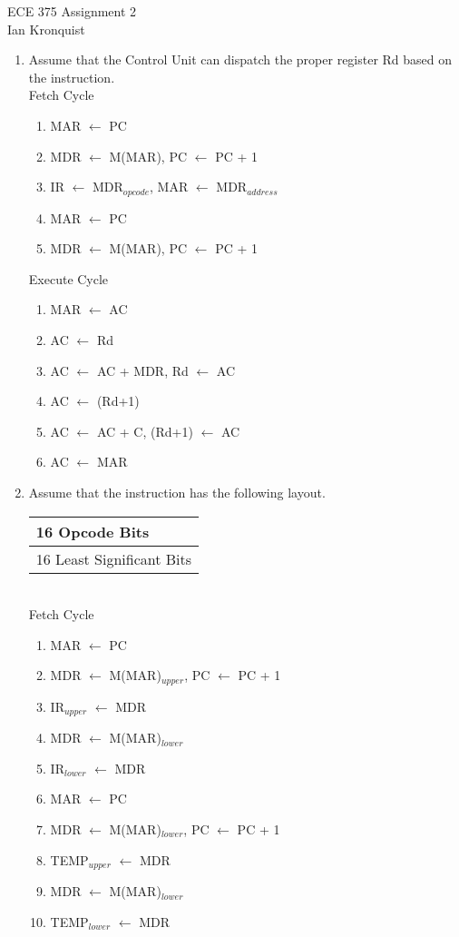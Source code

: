 \documentclass[12pt,letterpaper]{article}
\begin{document}
\begin{flushright}
{\large
ECE 375 Assignment 2\\
Ian Kronquist
}
\end{flushright}

\bigskip

\begin{enumerate}
    \item Assume that the Control Unit can dispatch the proper register Rd
    based on the instruction.\\
    Fetch Cycle
    \begin{enumerate}[i]
        \item MAR $\leftarrow$ PC
        \item MDR $\leftarrow$ M(MAR), PC $\leftarrow$ PC + 1
        \item IR $\leftarrow$ MDR$_{opcode}$, MAR $\leftarrow$ MDR$_{address}$
        \item MAR $\leftarrow$ PC
        \item MDR $\leftarrow$ M(MAR), PC $\leftarrow$ PC + 1
    \end{enumerate}

    Execute Cycle
    \begin{enumerate}[i]
        \item MAR $\leftarrow$ AC
        \item AC $\leftarrow$ Rd
        \item AC $\leftarrow$ AC + MDR, Rd $\leftarrow$ AC
        \item AC  $\leftarrow$ (Rd+1)
        \item AC $\leftarrow$ AC + C, (Rd+1) $\leftarrow$ AC
        \item AC $\leftarrow$ MAR
    \end{enumerate}
    \item Assume that the instruction has the following layout.\\
    \begin{tabular}{l}
        16 Opcode Bits\\
        \hline
        16 Least Significant Bits
    \end{tabular}\\
    Fetch Cycle
    \begin{enumerate}[i]
        \item MAR $\leftarrow$ PC
        \item MDR $\leftarrow$ M(MAR)$_{upper}$, PC $\leftarrow$ PC + 1
        \item IR$_{upper}$ $\leftarrow$ MDR
        \item MDR $\leftarrow$ M(MAR)$_{lower}$
        \item IR$_{lower}$ $\leftarrow$ MDR
        \item MAR $\leftarrow$ PC
        \item MDR $\leftarrow$ M(MAR)$_{lower}$, PC $\leftarrow$ PC + 1
        \item TEMP$_{upper}$ $\leftarrow$ MDR
        \item MDR $\leftarrow$ M(MAR)$_{lower}$
        \item TEMP$_{lower}$ $\leftarrow$ MDR
    \end{enumerate}


\end{enumerate}
\end{document}
